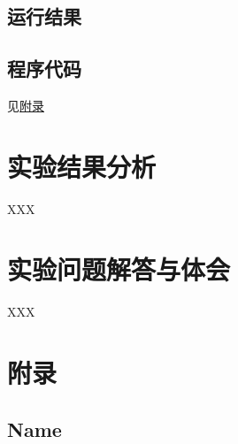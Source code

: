 \documentclass[a4paper]{ctexart}
\begin{document}
    \subsection{运行结果}

    \subsection{程序代码}
    见\hyperlink{appendix}{附录}

    \section{实验结果分析}
    XXX

    \newpage
    \section{实验问题解答与体会}
    XXX

    \newpage
    \appendix
    \hypertarget{appendix}{}
    \section*{附录}

    \subsection*{Name}
\end{document}

